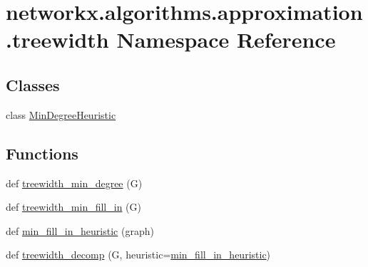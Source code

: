 \hypertarget{namespacenetworkx_1_1algorithms_1_1approximation_1_1treewidth}{}\section{networkx.\+algorithms.\+approximation.\+treewidth Namespace Reference}
\label{namespacenetworkx_1_1algorithms_1_1approximation_1_1treewidth}
\subsection*{Classes}
\begin{DoxyCompactItemize}
\item 
class \hyperlink{classnetworkx_1_1algorithms_1_1approximation_1_1treewidth_1_1MinDegreeHeuristic}{Min\+Degree\+Heuristic}
\end{DoxyCompactItemize}
\subsection*{Functions}
\begin{DoxyCompactItemize}
\item 
def \hyperlink{namespacenetworkx_1_1algorithms_1_1approximation_1_1treewidth_a61fc0c9223a43796cfaca14a69fe0a8c}{treewidth\+\_\+min\+\_\+degree} (G)
\item 
def \hyperlink{namespacenetworkx_1_1algorithms_1_1approximation_1_1treewidth_a80f9b50c25683439899cf76c8b7baeca}{treewidth\+\_\+min\+\_\+fill\+\_\+in} (G)
\item 
def \hyperlink{namespacenetworkx_1_1algorithms_1_1approximation_1_1treewidth_a0bb0e946b540b4d1287654403c7e38ba}{min\+\_\+fill\+\_\+in\+\_\+heuristic} (graph)
\item 
def \hyperlink{namespacenetworkx_1_1algorithms_1_1approximation_1_1treewidth_a237be07bcad07dfb38016e0938bbfcfc}{treewidth\+\_\+decomp} (G, heuristic=\hyperlink{namespacenetworkx_1_1algorithms_1_1approximation_1_1treewidth_a0bb0e946b540b4d1287654403c7e38ba}{min\+\_\+fill\+\_\+in\+\_\+heuristic})
\end{DoxyCompactItemize}


